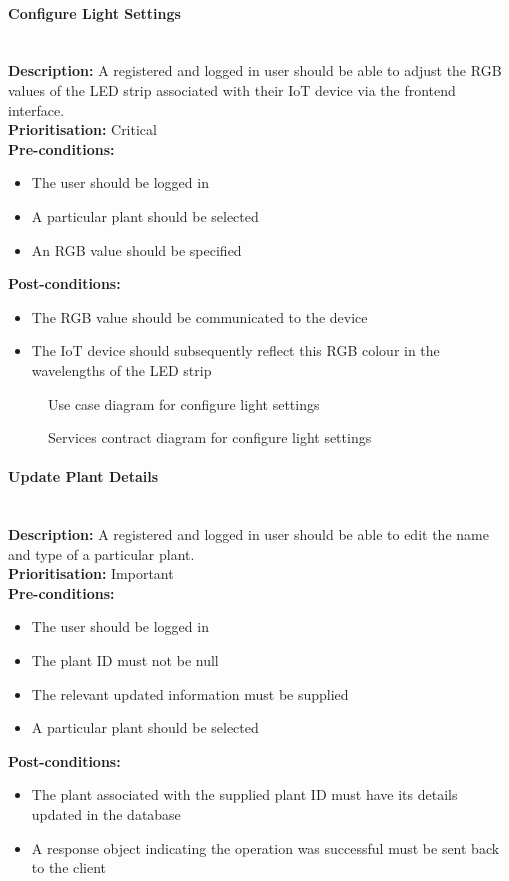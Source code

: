 \documentclass{article}
\begin{document}
	\paragraph{Configure Light Settings}\mbox{}\\
		\textbf{Description:} A registered and logged in user should be able to adjust the RGB values of the LED strip associated with their IoT device via the frontend interface.\\
		\textbf{Prioritisation:} Critical\\		
		\textbf{Pre-conditions:}
			\begin{itemize}
				\item The user should be logged in
				\item A particular plant should be selected
				\item An RGB value should be specified
			\end{itemize}
		\textbf{Post-conditions:}
			\begin{itemize}
				\item The RGB value should be communicated to the device
				\item The IoT device should subsequently reflect this RGB colour in the wavelengths of the LED strip
			\end{itemize}

		\begin{figure}[H]
			\caption{Use case diagram for configure light settings}
		\end{figure}
		
		\begin{figure}[H]
			\caption{Services contract diagram for configure light settings}
		\end{figure}
		
	\paragraph{Update Plant Details}\mbox{}\\
		\textbf{Description:} A registered and logged in user should be able to edit the name and type of a particular plant.\\
		\textbf{Prioritisation:} Important\\		
		\textbf{Pre-conditions:}
			\begin{itemize}
				\item The user should be logged in
				\item The plant ID must not be null
				\item The relevant updated information must be supplied
				\item A particular plant should be selected
			\end{itemize}
		\textbf{Post-conditions:}
			\begin{itemize}
				\item The plant associated with the supplied plant ID must have its details updated in the database
				\item A response object indicating the operation was successful must be sent back to the client
			\end{itemize}
\end{document}
